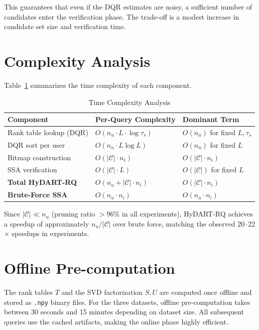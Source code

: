 This guarantees that even if the DQR estimates are noisy, a sufficient number of candidates enter the verification phase. The trade-off is a modest increase in candidate set size and verification time.

\section{Complexity Analysis}

Table~\ref{tab:complexity} summarizes the time complexity of each component.

\begin{table}[htbp]
\centering
\caption{Time Complexity Analysis}
\label{tab:complexity}
\begin{tabular}{lll}
\toprule
\textbf{Component} & \textbf{Per-Query Complexity} & \textbf{Dominant Term} \\
\midrule
Rank table lookup (DQR) & $O(n_u \cdot L \cdot \log \tau_s)$ & $O(n_u)$ for fixed $L, \tau_s$ \\
DQR sort per user & $O(n_u \cdot L \log L)$ & $O(n_u)$ for fixed $L$ \\
Bitmap construction & $O(|\mathcal{C}| \cdot n_i)$ & $O(|\mathcal{C}| \cdot n_i)$ \\
SSA verification & $O(|\mathcal{C}| \cdot L)$ & $O(|\mathcal{C}|)$ for fixed $L$ \\
\midrule
\textbf{Total HyDART-RQ} & $O(n_u + |\mathcal{C}| \cdot n_i)$ & $O(|\mathcal{C}| \cdot n_i)$ \\
\textbf{Brute-Force SSA} & $O(n_u \cdot n_i)$ & $O(n_u \cdot n_i)$ \\
\bottomrule
\end{tabular}
\end{table}

Since $|\mathcal{C}| \ll n_u$ (pruning ratio $> 96\%$ in all experiments), HyDART-RQ achieves a speedup of approximately $n_u / |\mathcal{C}|$ over brute force, matching the observed 20--22$\times$ speedups in experiments.

\section{Offline Pre-computation}

The rank tables $T$ and the SVD factorization $S, U$ are computed once offline and stored as \texttt{.npy} binary files. For the three datasets, offline pre-computation takes between 30 seconds and 15 minutes depending on dataset size. All subsequent queries use the cached artifacts, making the online phase highly efficient.

